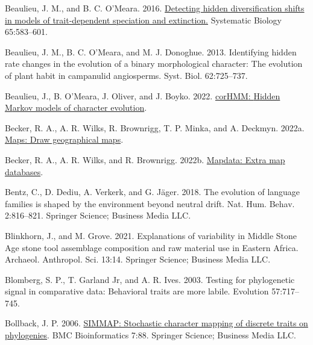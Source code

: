 \documentclass[fleqn,10pt,lineno]{wlpeerj} %
\newlength{\cslhangindent}
\newlength{\cslentryspacingunit} %
\newenvironment{CSLReferences}[2] %
 {%
  \setlength{\parindent}{0pt}
  \ifodd #1
  \let\oldpar\par
  \def\par{\hangindent=\cslhangindent\oldpar}
  \fi
  \setlength{\parskip}{#2\cslentryspacingunit}
 }%
 {}
\begin{document}
\begin{CSLReferences}{1}{0}
\leavevmode{}%
Beaulieu, J. M., and B. C. O'Meara. 2016. \href{https://academic.oup.com/sysbio/article/65/4/583/1753616}{Detecting hidden diversification shifts in models of trait-dependent speciation and extinction.} Systematic Biology 65:583--601.

\leavevmode{}%
Beaulieu, J. M., B. C. O'Meara, and M. J. Donoghue. 2013. Identifying hidden rate changes in the evolution of a binary morphological character: The evolution of plant habit in campanulid angiosperms. Syst. Biol. 62:725--737.

\leavevmode{}%
Beaulieu, J., B. O'Meara, J. Oliver, and J. Boyko. 2022. \href{https://CRAN.R-project.org/package=corHMM}{{corHMM}: {H}idden {M}arkov models of character evolution}.

\leavevmode{}%
Becker, R. A., A. R. Wilks, R. Brownrigg, T. P. Minka, and A. Deckmyn. 2022a. \href{https://CRAN.R-project.org/package=maps}{Maps: Draw geographical maps}.

\leavevmode{}%
Becker, R. A., A. R. Wilks, and R. Brownrigg. 2022b. \href{https://CRAN.R-project.org/package=mapdata}{Mapdata: Extra map databases}.

\leavevmode{}%
Bentz, C., D. Dediu, A. Verkerk, and G. Jäger. 2018. The evolution of language families is shaped by the environment beyond neutral drift. Nat. Hum. Behav. 2:816--821. Springer Science; Business Media LLC.

\leavevmode{}%
Blinkhorn, J., and M. Grove. 2021. Explanations of variability in {M}iddle {S}tone {A}ge stone tool assemblage composition and raw material use in {E}astern {A}frica. Archaeol. Anthropol. Sci. 13:14. Springer Science; Business Media LLC.

\leavevmode{}%
Blomberg, S. P., T. Garland Jr, and A. R. Ives. 2003. Testing for phylogenetic signal in comparative data: Behavioral traits are more labile. Evolution 57:717--745.

\leavevmode{}%
Bollback, J. P. 2006. \href{https://doi.org/10.1186/1471-2105-7-88}{{SIMMAP}: Stochastic character mapping of discrete traits on phylogenies}. {BMC} Bioinformatics 7:88. Springer Science; Business Media {LLC}.


\end{CSLReferences}
\end{document}
